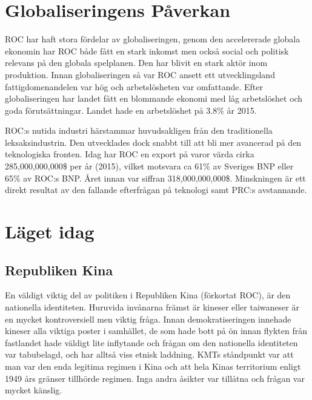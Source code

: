 \documentclass[a4paper,10pt]{article}
\begin{document}
\section*{Globaliseringens Påverkan}
ROC har haft stora fördelar av globaliseringen, genom den accelererade globala ekonomin har ROC både fått en stark inkomst men också social och politisk relevans på den globala spelplanen. Den har blivit en stark aktör inom produktion. Innan globaliseringen så var ROC ansett ett utvecklingsland fattigdomenandelen var hög och arbetslösheten var omfattande. Efter globaliseringen har landet fått en blommande ekonomi med låg arbetslöshet och goda förutsättningar. Landet hade en arbetslöshet på 3.8\% år 2015.

ROC:s nutida industri härstammar huvudsakligen från den traditionella leksaksindustrin. Den utvecklades dock snabbt till att bli mer avancerad på den teknologiska fronten. Idag har ROC en export på varor värda cirka 285,000,000,000\$ per år (2015), vilket motsvara ca 61\% av Sveriges BNP eller 65\% av ROC:s BNP. Året innan var siffran 318,000,000,000\$. Minskningen är ett direkt resultat av den fallande efterfrågan på teknologi samt PRC:s avstannande.  

\section*{Läget idag}

\subsection*{Republiken Kina}
En väldigt viktig del av politiken i Republiken Kina (förkortat ROC), är den nationella identiteten. Huruvida invånarna främst är kineser eller taiwaneser är en mycket kontroversiell men viktig fråga. Innan demokratiseringen innehade kineser alla viktiga poster i samhället, de som hade bott på ön innan flykten från fastlandet hade väldigt lite inflytande och frågan om den nationella identiteten var tabubelagd, och har alltså viss etnisk laddning. KMTs ståndpunkt var att man var den enda legitima regimen i Kina och att hela Kinas territorium enligt 1949 års gränser tillhörde regimen. Inga andra åsikter var tillåtna och frågan var mycket känslig.
\end{document}
